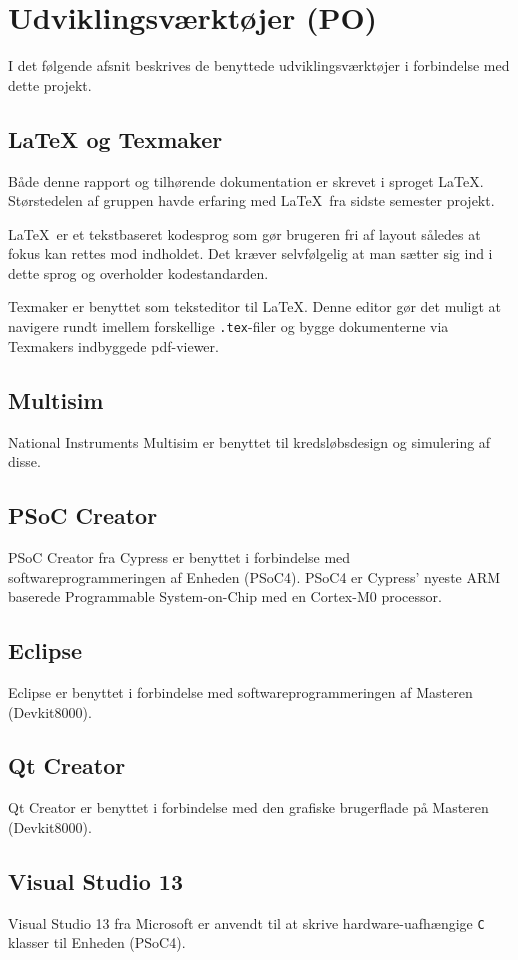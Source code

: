 \chapter{Udviklingsværktøjer (PO)} \label{head:udviklingsvaektoejer}
I det følgende afsnit beskrives de benyttede udviklingsværktøjer i forbindelse med dette projekt. 

\section{LaTeX og Texmaker}
Både denne rapport og tilhørende dokumentation er skrevet i sproget \LaTeX. Størstedelen af gruppen havde erfaring med \LaTeX\ fra sidste semester projekt. 

\LaTeX\ er et tekstbaseret kodesprog som gør brugeren fri af layout således at fokus kan rettes mod indholdet. Det kræver selvfølgelig at man sætter sig ind i dette sprog og overholder kodestandarden. 

Texmaker er benyttet som teksteditor til \LaTeX. Denne editor gør det muligt at navigere rundt imellem forskellige \verb+.tex+-filer og bygge dokumenterne via Texmakers indbyggede pdf-viewer.

\section{Multisim}
National Instruments Multisim er benyttet til kredsløbsdesign og simulering af disse. 

\section{PSoC Creator}
PSoC Creator fra Cypress er benyttet i forbindelse med softwareprogrammeringen af Enheden (PSoC4). PSoC4 er Cypress' nyeste ARM baserede Programmable System-on-Chip med en Cortex-M0 processor. 

\section{Eclipse}
Eclipse er benyttet i forbindelse med softwareprogrammeringen af Masteren (Devkit8000).

\section{Qt Creator}
Qt Creator er benyttet i forbindelse med den grafiske brugerflade på Masteren (Devkit8000).

\section{Visual Studio 13}
Visual Studio 13 fra Microsoft er anvendt til at skrive hardware-uafhængige \verb+C+ klasser til Enheden (PSoC4).

